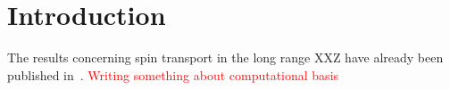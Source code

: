 \chapter{Introduction}
\thispagestyle{chapterBeginStyle}

The results concerning spin transport in the long range XXZ have already been published in~\textcite{Mierzejewski2023}.
\textcolor{red}{Writing something about computational basis}